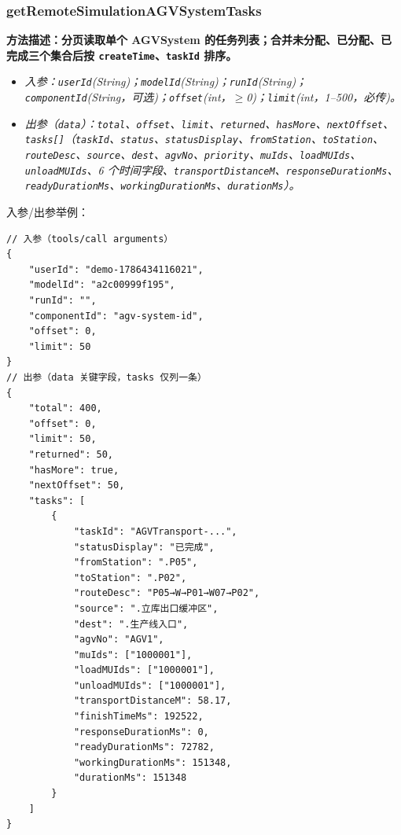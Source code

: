 \subsubsection{getRemoteSimulationAGVSystemTasks}
\bf{方法描述}：分页读取单个 AGVSystem 的任务列表；合并未分配、已分配、已完成三个集合后按 \texttt{createTime}、\texttt{taskId} 排序。
\begin{itemize}
	\item \it{入参}：\texttt{userId}(String)；\texttt{modelId}(String)；\texttt{runId}(String)；\texttt{componentId}(String，可选)；\texttt{offset}(int，$\geq$0)；\texttt{limit}(int，1--500，必传)。
	\item \it{出参}（\texttt{data}）：\texttt{total}、\texttt{offset}、\texttt{limit}、\texttt{returned}、\texttt{hasMore}、\texttt{nextOffset}、\texttt{tasks[]}（\texttt{taskId}、\texttt{status}、\texttt{statusDisplay}、\texttt{fromStation}、\texttt{toStation}、\texttt{routeDesc}、\texttt{source}、\texttt{dest}、\texttt{agvNo}、\texttt{priority}、\texttt{muIds}、\texttt{loadMUIds}、\texttt{unloadMUIds}、6 个时间字段、\texttt{transportDistanceM}、\texttt{responseDurationMs}、\texttt{readyDurationMs}、\texttt{workingDurationMs}、\texttt{durationMs}）。
\end{itemize}
入参/出参举例：
\begin{lstlisting}
// 入参（tools/call arguments）
{
    "userId": "demo-1786434116021",
    "modelId": "a2c00999f195",
    "runId": "",
    "componentId": "agv-system-id",
    "offset": 0,
    "limit": 50
}
// 出参（data 关键字段，tasks 仅列一条）
{
    "total": 400,
    "offset": 0,
    "limit": 50,
    "returned": 50,
    "hasMore": true,
    "nextOffset": 50,
    "tasks": [
        {
            "taskId": "AGVTransport-...",
            "statusDisplay": "已完成",
            "fromStation": ".P05",
            "toStation": ".P02",
            "routeDesc": "P05→W→P01→W07→P02",
            "source": ".立库出口缓冲区",
            "dest": ".生产线入口",
            "agvNo": "AGV1",
            "muIds": ["1000001"],
            "loadMUIds": ["1000001"],
            "unloadMUIds": ["1000001"],
            "transportDistanceM": 58.17,
            "finishTimeMs": 192522,
            "responseDurationMs": 0,
            "readyDurationMs": 72782,
            "workingDurationMs": 151348,
            "durationMs": 151348
        }
    ]
}
\end{lstlisting}\vspace{-30pt}

